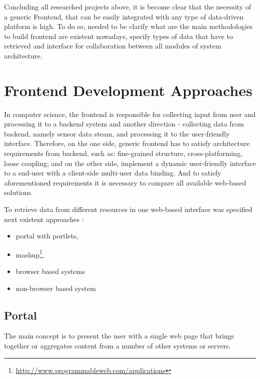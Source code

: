     Concluding all researched projects above, it is become clear that the necessity of a generic Frontend, that can be easily integrated with any type of data-driven platform is high. To do so, needed to be clarify what are the main methodologies to build frontend are existent nowadays, specify types of data that have to retrieved and interface for collaboration between all modules of system architecture.

\section{Frontend Development Approaches}
In computer science, the frontend is responsible for collecting input from user and processing it to a backend system and another direction - collecting data from backend, namely sensor data steam, and processing it to the user-friendly interface. 
Therefore, on the one side, generic frontend has to satisfy architecture requirements from backend, such as: fine-grained structure, cross-platforming, loose coupling; and on the other side, implement a dynamic user-friendly interface to a end-user with a client-side multi-user data binding. And to satisfy aforementioned requirements it is necessary to compare all available web-based solutions.

To retrieve data from different resources in one web-based interface was specified next existent approaches :
\begin{itemize}
 \item portal with portlets,
 \item mashup\footnote{\url{http://www.programmableweb.com/applications}},
 \item browser based systems
 \item non-browser based system
\end{itemize}
	\subsection{Portal}
		The main concept is to present the user with a single web page that brings together or aggregates content from a number of other systems or servers. 

